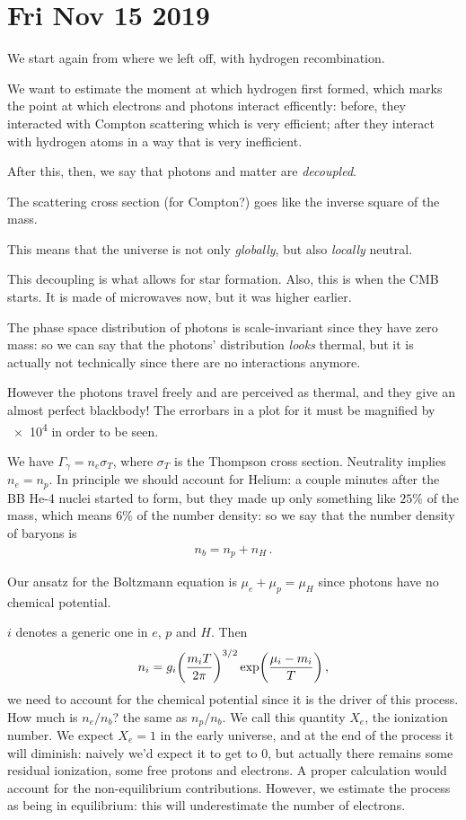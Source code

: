 \documentclass[main.tex]{subfiles}
\begin{document}
\section*{Fri Nov 15 2019}

We start again from where we left off, with hydrogen recombination.

We want to estimate the moment at which hydrogen first formed, which marks the point at which electrons and photons interact efficently: before, they interacted with Compton scattering which is very efficient; after they interact with hydrogen atoms in a way that is very inefficient.

After this, then, we say that photons and matter are \emph{decoupled}.

The scattering cross section (for Compton?) goes like the inverse square of the mass.

This means that the universe is not only \emph{globally},  but also \emph{locally} neutral.

This decoupling is what allows for star formation.
Also, this is when the CMB starts.
It is made of microwaves now, but it was higher earlier.

The phase space distribution of photons is scale-invariant since they have zero mass: so we can say that the photons' distribution \emph{looks} thermal, but it is actually not technically since there are no interactions anymore.

However the photons travel freely and are perceived as thermal, and they give an almost perfect blackbody! The errorbars in a plot for it must be magnified by \num{e4} in order to be seen.

We have \(\Gamma_{\gamma } = n_e \sigma_T\), where \(\sigma _T\) is the Thompson cross section. 
Neutrality implies \(n_e = n_p\).
In principle we should account for Helium: a couple minutes after the BB He-4 nuclei started to form, but they made up only something like \(25\%\) of the mass, which means \(6\%\) of the number density: so we say that the number density of baryons is 
%
\begin{align}
  n_b = n_p + n_H
\,.
\end{align}
%

Our ansatz for the Boltzmann equation is \(\mu_e + \mu _p = \mu _H\) since photons have no chemical potential.

\(i\) denotes a generic one in \(e\), \(p\) and \(H\).
Then 
%
\begin{align}
  n_i = g_i\qty(\frac{m_i T}{2 \pi })^{3/2} \exp(\frac{\mu _i - m_i}{T})
\,,
\end{align}
%
we need to account for the chemical potential since it is the driver of this process.
How much is \(n_e / n_b\)? the same as \(n_p / n_b\). We call this quantity \(X_e\), the ionization number.
We expect \(X_e = 1\) in the early universe, and at the end of the process it will diminish: naively we'd expect it to get to 0, but actually there remains some residual ionization, some free protons and electrons.
A proper calculation would account for the non-equilibrium contributions.
However, we estimate the process as being in equilibrium: this will underestimate the number of electrons.
\end{document}
